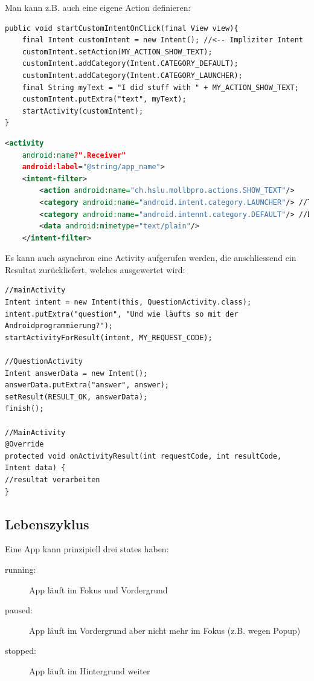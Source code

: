 \documentclass[a4paper, 11pt]{article}
\begin{document}
Man kann z.B. auch eine eigene Action definieren:

\begin{lstlisting}[caption={Erstellung eines eigenen Custom Action}]
public void startCustomIntentOnClick(final View view){
	final Intent customIntent = new Intent(); //<-- Impliziter Intent
	customIntent.setAction(MY_ACTION_SHOW_TEXT);
	customIntent.addCategory(Intent.CATEGORY_DEFAULT);
	customIntent.addCategory(Intent.CATEGORY_LAUNCHER);
	final String myText = "I did stuff with " + MY_ACTION_SHOW_TEXT;
	customIntent.putExtra("text", myText);
	startActivity(customIntent);
}
\end{lstlisting}

\begin{lstlisting}[language=xml, caption={Registrierung des Intent-Filters im Manifest}]
<activity 
	android:name?".Receiver"
	android:label="@string/app_name">
	<intent-filter>
		<action android:name="ch.hslu.mollbpro.actions.SHOW_TEXT"/>
		<category android:name="android.intent.category.LAUNCHER"/>	//Top Level auf Launcher
		<category android:name="android.intennt.category.DEFAULT"/>	//Default Action
		<data android:mimetype="text/plain"/>
	</intent-filter>
\end{lstlisting}

Es kann auch asynchron eine Activity aufgerufen werden, die anschliessend ein Resultat zurückliefert, welches ausgewertet wird:

\begin{lstlisting}[captionpos=b, caption={Beispiel eines asynchronen Methodenaufrufs}]
//mainActivity
Intent intent = new Intent(this, QuestionActivity.class);
intent.putExtra("question", "Und wie läufts so mit der Androidprogrammierung?");
startActivityForResult(intent, MY_REQUEST_CODE);

//QuestionActivity
Intent answerData = new Intent();
answerData.putExtra("answer", answer);
setResult(RESULT_OK, answerData);
finish();

//MainActivity
@Override
protected void onActivityResult(int requestCode, int resultCode, Intent data) {
//resultat verarbeiten
}
\end{lstlisting}

\subsection{Lebenszyklus}
Eine App kann prinzipiell drei states haben:

\begin{description}
	\item[running: ] App läuft im Fokus und Vordergrund
	\item[paused: ] App läuft im Vordergrund aber nicht mehr im Fokus (z.B. wegen Popup)
	\item[stopped: ] App läuft im Hintergrund weiter
\end{description}
\end{document}
